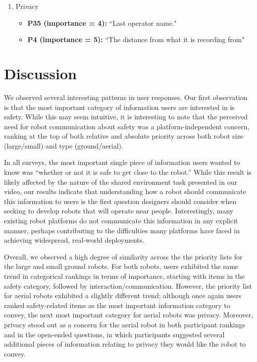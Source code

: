 \documentclass[letterpaper, 10 pt, conference]{ieeeconf}  %
\begin{document}
\begin{enumerate}
\item Privacy
    \begin{itemize}
        \item  \textbf{P35 (importance = 4):} ``Last operator name."
        \item  \textbf{P4 (importance = 5):} ``The distance from what it is recording from"
    \end{itemize}

\end{enumerate}



\section{Discussion}
We observed several interesting patterns in user responses. Our first observation is that the most important category of information users are interested in is safety. While this may seem intuitive, it is interesting to note that the perceived need for robot communication about safety was a platform-independent concern, ranking at the top of both relative and absolute priority across both robot size (large/small) and type (ground/aerial).

In all surveys, the most important single piece of information users wanted to know was ``whether or not it is safe to get close to the robot.'' While this result is likely affected by the nature of the shared environment task presented in our video, our results indicate that understanding how a robot should communicate this information to users is the first question designers should consider when seeking to develop robots that will operate near people. Interestingly, many existing robot platforms do not communicate this information in any explicit manner, perhaps contributing to the difficulties many platforms have faced in achieving widespread, real-world deployments. %

Overall, we observed a high degree of similarity across the the priority lists for the large and small ground robots. For both robots, users exhibited the same trend in categorical rankings in terms of importance, starting with items in the safety category, followed by interaction/communication. However, the priority list for aerial robots exhibited a slightly different trend; although once again users ranked safety-related items as the most important information category to convey, the next most important category for aerial robots was privacy. Moreover, privacy stood out as a concern for the aerial robot in both participant rankings and in the open-ended questions, in which participants suggested several additional pieces of information relating to privacy they would like the robot to convey. 
\end{document}
